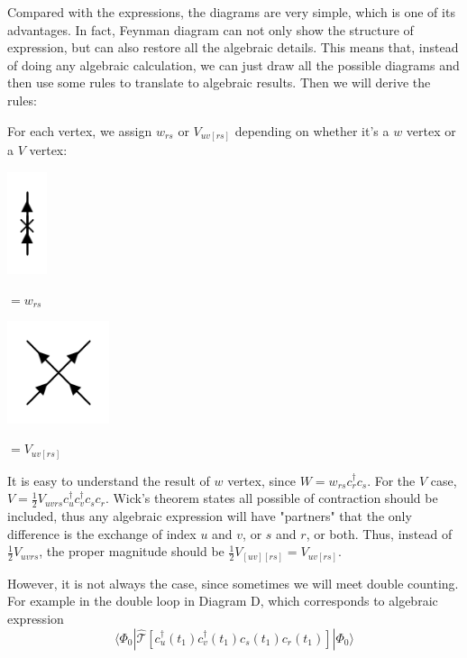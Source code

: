 Compared with the expressions, the diagrams are very simple, which is one of its advantages.
In fact, Feynman diagram can not only show the structure of expression, but can also restore all the algebraic details.
This means that, instead of doing any algebraic calculation, we can just draw all the possible diagrams and then use some rules to translate to algebraic results.
Then we will derive the rules:

For each vertex, we assign $w_{rs}$ or $V_{uv[rs]}$ depending on whether it's a $w$ vertex or a $V$ vertex:

\hspace{0.2\textwidth}
\begin{minipage}{0.08\textwidth}
	\includegraphics[height=3cm]{figures/vertexW.png}
\end{minipage}
\begin{minipage}{0.2\textwidth}
	$=w_{rs}$
\end{minipage}
\begin{minipage}{0.18\textwidth}
	\includegraphics[height=3cm]{figures/vertexV.png}
\end{minipage}
\begin{minipage}{0.1\textwidth}
	$=V_{uv[rs]}$
\end{minipage}

It is easy to understand the result of $w$ vertex, since $W=w_{rs} c_r^{\dagger} c_s$.
For the $V$ case, $V=\frac{1}{2}V_{uvrs} c_u^{\dagger} c_v^{\dagger} c_s c_r$.
Wick's theorem states all possible of contraction should be included, thus any algebraic expression will have "partners" that the only difference is the exchange of index $u$ and $v$, or $s$ and $r$, or both.
Thus, instead of $\frac{1}{2}V_{uvrs}$, the proper magnitude should be $\frac{1}{2}V_{[uv][rs]}=V_{uv[rs]}$.

However, it is not always the case, since sometimes we will meet double counting.
For example in the double loop in Diagram D, which corresponds to algebraic expression
\begin{equation}
	\langle\Phi_{0}|
	\hat{\mathcal{T}}\left[
		c_{u}^{\dagger}\left(t_{1}\right) 
		c_{v}^{\dagger}\left(t_{1}\right)
		c_{s}\left(t_{1}\right) 
		c_{r}\left(t_{1}\right)
	\right]
	| \Phi_{0}\rangle
\end{equation}

